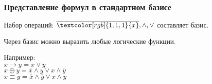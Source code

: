 \begin{frame}
\frametitle{Представление формул в стандартном базисе}
Набор операций: $\overline{\textcolor[rgb]{1,1,1}{x}}, \wedge, \vee$ составляет базис. \pause
 
Через базис можно выразить любые логические функции.

Например:\\
$x \rightarrow y = \overline{x} \vee y$\\ \pause
$x \oplus y = \overline{x}\wedge y \vee x\wedge \overline{y}$\\ \pause
$x \equiv y = \overline{x}\wedge \overline{y} \vee x\wedge y$\\ \pause



\end{frame}
